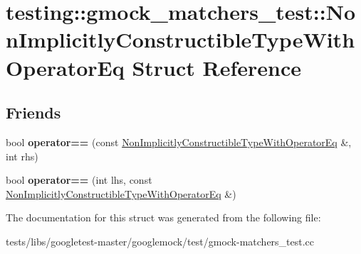 \hypertarget{structtesting_1_1gmock__matchers__test_1_1NonImplicitlyConstructibleTypeWithOperatorEq}{}\section{testing\+:\+:gmock\+\_\+matchers\+\_\+test\+:\+:Non\+Implicitly\+Constructible\+Type\+With\+Operator\+Eq Struct Reference}
\label{structtesting_1_1gmock__matchers__test_1_1NonImplicitlyConstructibleTypeWithOperatorEq}
\subsection*{Friends}
\begin{DoxyCompactItemize}
\item 
\mbox{\label{structtesting_1_1gmock__matchers__test_1_1NonImplicitlyConstructibleTypeWithOperatorEq_a20e9067f1f4becd397742e0db7351d6a}} 
bool {\bfseries operator==} (const \hyperlink{structtesting_1_1gmock__matchers__test_1_1NonImplicitlyConstructibleTypeWithOperatorEq}{Non\+Implicitly\+Constructible\+Type\+With\+Operator\+Eq} \&, int rhs)
\item 
\mbox{\label{structtesting_1_1gmock__matchers__test_1_1NonImplicitlyConstructibleTypeWithOperatorEq_a801c8151d7f7ff24243019980934d143}} 
bool {\bfseries operator==} (int lhs, const \hyperlink{structtesting_1_1gmock__matchers__test_1_1NonImplicitlyConstructibleTypeWithOperatorEq}{Non\+Implicitly\+Constructible\+Type\+With\+Operator\+Eq} \&)
\end{DoxyCompactItemize}


The documentation for this struct was generated from the following file\+:\begin{DoxyCompactItemize}
\item 
tests/libs/googletest-\/master/googlemock/test/gmock-\/matchers\+\_\+test.\+cc\end{DoxyCompactItemize}
